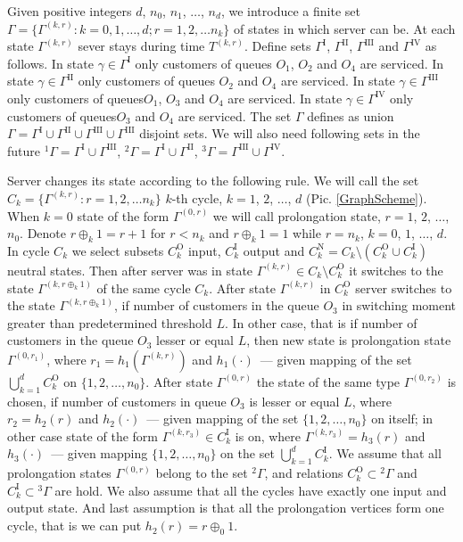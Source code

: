 \documentclass[10pt]{article}
\begin{document}
Given positive integers $d$, $n_0$, $n_1$, $\ldots$, $n_d$, we introduce a finite set $\Gamma=\{\Gamma^{(k,r)} \colon k=0,1,\ldots,d; r=1,2,\ldots n_k\}$ of states in which server can be. At each state $\Gamma^{(k,r)}$ sever stays during time $T^{(k,r)}$. Define sets $\Gamma^{\mathrm{I}}$, $\Gamma^{\mathrm{II}}$, $\Gamma^{\mathrm{III}}$ and $\Gamma^{\mathrm{IV}}$ as follows. 
In state $\gamma \in \Gamma^{\mathrm{I}}$ only customers of queues $O_1$, $O_2$ and $O_4$ are serviced.
In state $\gamma \in \Gamma^{\mathrm{II}}$ only customers of queues $O_2$ and $O_4$ are serviced.
In state $\gamma \in \Gamma^{\mathrm{III}}$ only customers of queues$O_1$, $O_3$ and $O_4$ are serviced.
In state $\gamma \in \Gamma^{\mathrm{IV}}$ only customers of queues$O_3$ and $O_4$ are serviced.
The set $\Gamma$ defines as union $\Gamma = \Gamma^{\mathrm{I}} \cup \Gamma^{\mathrm{II}} \cup \Gamma^{\mathrm{III}} \cup \Gamma^{\mathrm{III}}$ disjoint sets. We will also need following sets in the future ${}^1\Gamma=\Gamma^{\mathrm{I}} \cup \Gamma^{\mathrm{III}}$, 
${}^2\Gamma=\Gamma^{\mathrm{I}} \cup \Gamma^{\mathrm{II}}$,
${}^3\Gamma=\Gamma^{\mathrm{III}} \cup \Gamma^{\mathrm{IV}}$. 

Server changes its state according to the following rule. We will call the set $C_k = \{\Gamma^{(k,r)} \colon r=1,2,\ldots n_k\}$  $k$-th cycle, $k=1$, $2$, $\ldots$, $d$ (Pic. \ref{GraphScheme}). When $k=0$ state of the form 
$\Gamma^{(0,r)}$ we will call prolongation state, $r=1$, $2$, $\ldots$, $n_0$. Denote $r \oplus_k 1 = r+1$ for $r<n_k$ and $r \oplus_k 1 = 1$ while $r=n_k$, $k = 0$, $1$, $\ldots$, $d$. In cycle $C_k$ we select subsets $C_k^{\mathrm{O}}$ input, $C_k^{\mathrm{I}}$ output and $C_k^{\mathrm{N}} = C_k \setminus (C_k^{\mathrm{O}} \cup C_k^{\mathrm{I}})$ neutral states. 
Then  after server was in state $\Gamma^{(k,r)} \in C_k\setminus C_k^{\mathrm{O}}$ it switches to the state $\Gamma^{(k,r \oplus_k 1)}$ of the same cycle $C_k$. 
After state $\Gamma^{(k,r)}$ in $C_k^{\mathrm{O}}$ server switches to the state $\Gamma^{(k,r \oplus_k 1)}$, if number of customers in the queue $O_3$ in switching moment greater than predetermined threshold $L$. In other case,  that is if number of customers in the queue $O_3$ lesser or equal $L$, then new state is prolongation state $\Gamma^{(0,r_1)}$, where 
$r_1=h_1(\Gamma^{(k,r)})$ and
$h_1(\cdot)$~--- given mapping of the set 
$\bigcup\limits_{k=1}^d C_k^{\mathrm{O}}$ on $\{1,2,\ldots, n_0\}$. 
After state $\Gamma^{(0,r)}$ the state of the same type $\Gamma^{(0,r_2)}$ is chosen, if number of customers in queue $O_3$ is lesser or equal $L$, where $r_2=h_2(r)$ and $h_2(\cdot)$~--- given mapping of the 
set $\{1,2, \ldots, n_0\}$ on itself; in other case state of the form $\Gamma^{(k,r_3)} \in C_k^{\mathrm{I}}$ is on, where $\Gamma^{(k,r_3)}=h_3(r)$ and $h_3(\cdot)$~--- given mapping $\{1,2, \ldots, n_0\}$ on the set  $\bigcup\limits_{k=1}^d C_k^{\mathrm{I}}$. We assume that all prolongation states $\Gamma^{(0,r)}$ belong to the set ${}^2 \Gamma$, and  relations $C_k^\mathrm{O}\subset {}^2 \Gamma$ and $C_k^\mathrm{I}\subset {}^3 \Gamma$ are hold. We also assume that all the cycles have exactly one input and output state. And last assumption is that all the prolongation vertices form one cycle, that is we can put $h_2(r)=r\oplus_0 1$.
\end{document}

